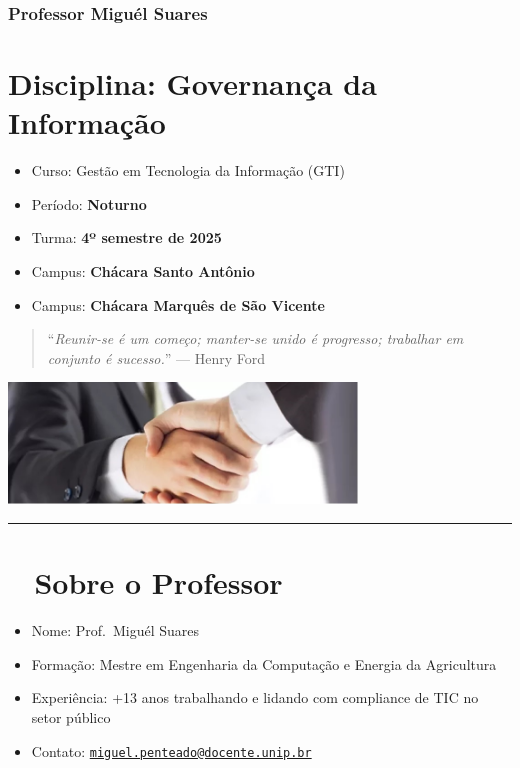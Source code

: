 \documentclass[
]{book}
\providecommand{\tightlist}{%
  \setlength{\itemsep}{0pt}\setlength{\parskip}{0pt}}
\begin{document}
\subsubsection*{Professor Miguél Suares}\label{professor-miguuxe9l-suares}

\section{\texorpdfstring{Disciplina: \textbf{Governança da Informação}}{Disciplina: Governança da Informação}}\label{disciplina-governanuxe7a-da-informauxe7uxe3o}

\begin{itemize}
\tightlist
\item
  Curso: Gestão em Tecnologia da Informação (GTI)\\
\item
  Período: \textbf{Noturno}\\
\item
  Turma: \textbf{4º semestre de 2025}
\item
  Campus: \textbf{Chácara Santo Antônio}
\item
  Campus: \textbf{Chácara Marquês de São Vicente}
\end{itemize}

\begin{quote}
``\emph{Reunir-se é um começo; manter-se unido é progresso; trabalhar em conjunto é sucesso.}'' --- Henry Ford
\end{quote}

\includegraphics[width=3.64583in,height=\textheight]{images/Bem_Vindo.jpg}

\begin{center}\rule{0.5\linewidth}{0.5pt}\end{center}

\section{👨‍🏫 Sobre o Professor}\label{sobre-o-professor}

\begin{itemize}
\item
  Nome: Prof.~Miguél Suares
\item
  Formação: Mestre em Engenharia da Computação e Energia da Agricultura
\item
  Experiência: +13 anos trabalhando e lidando com compliance de TIC no setor público
\item
  Contato: \href{mailto:miguel.penteado@docente.unip.br}{\nolinkurl{miguel.penteado@docente.unip.br}}
\end{itemize}
\end{document}
